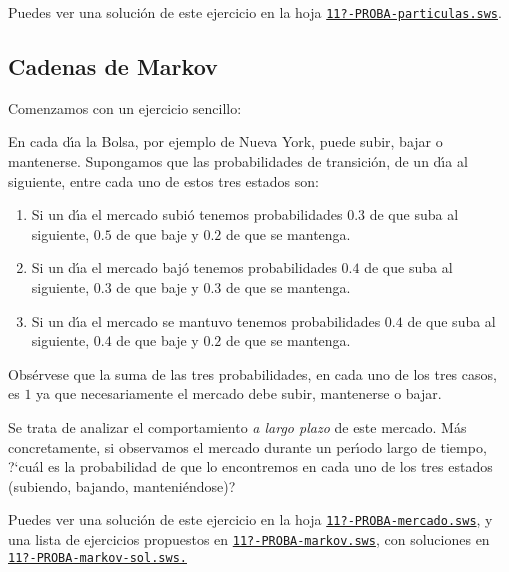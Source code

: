  
 
 Puedes ver una soluci\'on de este ejercicio  en la hoja 
 \href{http://sage.mat.uam.es:8888/home/pub/??/}{\tt 11?-PROBA-particulas.sws}.
 

 

 \subsection{Cadenas de Markov}
Comenzamos con un ejercicio sencillo:

\begin{ejer}
En cada d\'{\i}a la Bolsa, por ejemplo de Nueva York, puede subir, bajar o
mantenerse. Supongamos que las probabilidades de transici\'on, de un d\'{\i}a al
siguiente,  entre cada uno de estos tres estados son:
\begin{enumerate}
 \item Si un d\'{\i}a el mercado subi\'o tenemos probabilidades
$0{.}3$ de que suba al siguiente, $0{.}5$ de que baje y $0{.}2$ de que se
mantenga.
\item Si un d\'{\i}a el mercado baj\'o tenemos probabilidades
$0{.}4$ de que suba al siguiente, $0{.}3$ de que baje y $0{.}3$ de que se
mantenga.
 
 \item Si un d\'{\i}a el mercado se mantuvo tenemos probabilidades
$0{.}4$ de que suba al siguiente, $0{.}4$ de que baje y $0{.}2$ de que se
mantenga.
\end{enumerate}

Obs\'ervese que la suma de las tres probabilidades, en cada uno de los tres
casos, es $1$ ya que necesariamente el mercado debe subir, mantenerse o bajar. 


Se trata de analizar el comportamiento {\itshape a largo plazo} de este mercado.
M\'as concretamente, si observamos el mercado durante un per\'{\i}odo largo de
tiempo, ?`cu\'al es la probabilidad de que lo encontremos en cada uno de los
tres estados (subiendo, bajando, manteni\'endose)?
\end{ejer}

Puedes ver una soluci\'on de este ejercicio  en la hoja 
 \href{http://sage.mat.uam.es:8888/home/pub/??/}{\tt 11?-PROBA-mercado.sws},
y una lista de ejercicios propuestos en 
\href{http://sage.mat.uam.es:8888/home/pub/??/}{\tt 11?-PROBA-markov.sws}, con
soluciones en 
\href{http://sage.mat.uam.es:8888/home/pub/??/}{\tt 11?-PROBA-markov-sol.sws.}

